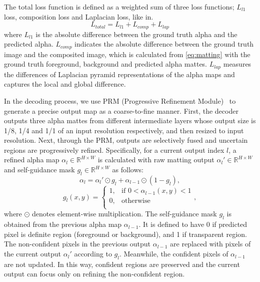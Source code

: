 \documentclass[10pt,twocolumn,letterpaper]{article}
\begin{document}
The total loss function is defined as a weighted sum of three loss functions; $L_{l1}$ loss, composition loss\cite{xu2017deep} and Laplacian loss\cite{hou2019context}, like in\cite{yu2021mask}.
\begin{equation}
  L_{total} = L_{l1} + L_{comp} + L_{lap}
  \label{eq:loss}
\end{equation}
where $L_{l1}$ is the absolute difference between the ground truth alpha and the predicted alpha. $L_{comp}$ indicates the absolute difference between the ground truth image and the composited image, which is calculated from \cref{eq:matting} with the ground truth foreground, background and predicted alpha mattes. $L_{lap}$ measures the differences of Laplacian pyramid representations of the alpha maps and captures the local and global difference. 

In the decoding process, we use PRM (Progressive Refinement Module)~\cite{yu2021mask} to generate a precise output map as a coarse-to-fine manner.
First, the decoder outputs three alpha mattes from different intermediate layers whose output size is 1/8, 1/4 and 1/1 of an input resolution respectively, and then resized to input resolution.
Next, through the PRM, outputs are selectively fused and uncertain regions are progressively refined. Specifically, for a current output index $l$, a refined alpha map $\alpha_{l} \in \mathbb{R}^{H\times W}$ is calculated with raw matting output ${\alpha_{l}}'\in \mathbb{R}^{H\times W}$ and self-guidance mask $g_{l}\in \mathbb{R}^{H\times W}$ as follows:
\begin{equation}
  \alpha_{l} = {\alpha_{l}}' \odot g_{l} + \alpha_{l-1} \odot (1-g_{l}),
  \label{eq:PRM1}
\end{equation}
\begin{equation}
    g_{l}(x,y) = 
\begin{cases}
    1, & \text{if } 0 <\alpha_{l-1}(x,y) < 1 \\
    0,              & \text{otherwise} \\
\end{cases},
\label{eq:PRM2}
\end{equation}
where $\odot$ denotes element-wise multiplication.
The self-guidance mask $g_{l}$ is obtained from the previous alpha map $\alpha_{l-1}$.
It is defined to have 0 if predicted pixel is definite region (foreground or background), and 1 if transparent region.
The non-confident pixels in the previous output $\alpha_{l-1}$ are replaced with pixels of the current output ${\alpha_{l}}'$ according to $g_{l}$. Meanwhile, the confident pixels of $\alpha_{l-1}$ are not updated.
In this way, confident regions are preserved and the current output can focus only on refining the non-confident region. 
\end{document}
